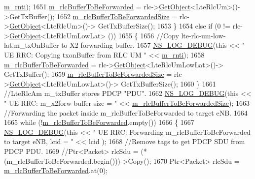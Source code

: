 \begin{DoxyCode}
      \hyperlink{classns3_1_1LteUeRrc_a8e078d8ef0ad23e670fe2ef08caab84f}{m\_rnti});
1651     \hyperlink{classns3_1_1LteUeRrc_acf565bc650023495082a94923956fb1a}{m\_rlcBufferToBeForwarded} = rlc->\hyperlink{classns3_1_1Object_a13e18c00017096c8381eb651d5bd0783}{GetObject}<LteRlcUm>()->GetTxBuffer();
1652     \hyperlink{classns3_1_1LteUeRrc_afb37a53dac05a0ae624acab488e33d6f}{m\_rlcBufferToBeForwardedSize} =  rlc->\hyperlink{classns3_1_1Object_a13e18c00017096c8381eb651d5bd0783}{GetObject}<LteRlcUm>()->
      GetTxBufferSize();
1653   \}
1654   \textcolor{keywordflow}{else} \textcolor{keywordflow}{if} (0 != rlc->\hyperlink{classns3_1_1Object_a13e18c00017096c8381eb651d5bd0783}{GetObject}<LteRlcUmLowLat> ())
1655   \{
1656     \textcolor{comment}{//Copy lte-rlc-um-low-lat.m\_txOnBuffer to X2 forwarding buffer.}
1657     \hyperlink{group__logging_ga413f1886406d49f59a6a0a89b77b4d0a}{NS\_LOG\_DEBUG}(\textcolor{keyword}{this} << \textcolor{stringliteral}{" UE RRC: Copying txonBuffer from RLC UM "} << 
      \hyperlink{classns3_1_1LteUeRrc_a8e078d8ef0ad23e670fe2ef08caab84f}{m\_rnti});
1658     \hyperlink{classns3_1_1LteUeRrc_acf565bc650023495082a94923956fb1a}{m\_rlcBufferToBeForwarded} = rlc->\hyperlink{classns3_1_1Object_a13e18c00017096c8381eb651d5bd0783}{GetObject}<LteRlcUmLowLat>()->
      GetTxBuffer();
1659     \hyperlink{classns3_1_1LteUeRrc_afb37a53dac05a0ae624acab488e33d6f}{m\_rlcBufferToBeForwardedSize} =  rlc->\hyperlink{classns3_1_1Object_a13e18c00017096c8381eb651d5bd0783}{GetObject}<LteRlcUmLowLat>()->
      GetTxBufferSize();
1660   \}
1661   \textcolor{comment}{//LteRlcAm m\_txBuffer stores PDCP "PDU".}
1662   \hyperlink{group__logging_ga413f1886406d49f59a6a0a89b77b4d0a}{NS\_LOG\_DEBUG}(\textcolor{keyword}{this} << \textcolor{stringliteral}{" UE RRC: m\_x2forw buffer size = "} << 
      \hyperlink{classns3_1_1LteUeRrc_afb37a53dac05a0ae624acab488e33d6f}{m\_rlcBufferToBeForwardedSize});
1663     \textcolor{comment}{//Forwarding the packet inside m\_rlcBufferToBeForwarded to target eNB. }
1664 
1665   \textcolor{keywordflow}{while} (!\hyperlink{classns3_1_1LteUeRrc_acf565bc650023495082a94923956fb1a}{m\_rlcBufferToBeForwarded}.empty())
1666   \{
1667     \hyperlink{group__logging_ga413f1886406d49f59a6a0a89b77b4d0a}{NS\_LOG\_DEBUG}(\textcolor{keyword}{this} << \textcolor{stringliteral}{" UE RRC: Forwarding m\_rlcBufferToBeForwarded to target eNB, lcid = "} 
      << lcid );
1668     \textcolor{comment}{//Remove tags to get PDCP SDU from PDCP PDU.}
1669     \textcolor{comment}{//Ptr<Packet> rlcSdu =  (*(m\_rlcBufferToBeForwarded.begin()))->Copy();}
1670     Ptr<Packet> rlcSdu =  \hyperlink{classns3_1_1LteUeRrc_acf565bc650023495082a94923956fb1a}{m\_rlcBufferToBeForwarded}.at(0);

\end{DoxyCode}
